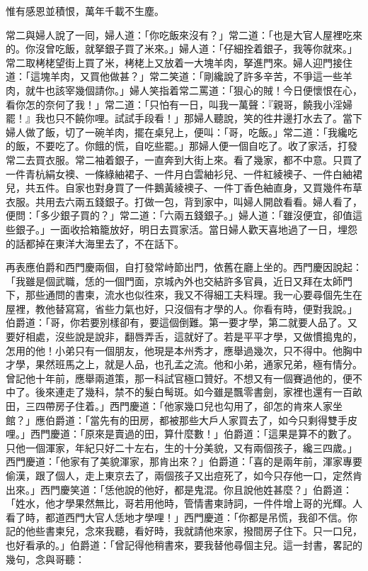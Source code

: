 \begin{myquote}
惟有感恩並積恨，萬年千載不生塵。
\end{myquote}

常二與婦人說了一囘，婦人道：「你吃飯來沒有？」常二道：「也是大官人屋裡吃來的。你沒曾吃飯，就拏銀子買了米來。」婦人道：「仔細拴着銀子，我等你就來。」{}常二取栲栳望街上買了米，栲栳上又放着一大塊羊肉，拏進門來。婦人迎門接住道：「這塊羊肉，又買他做甚？」常二笑道：「剛纔說了許多辛苦，不爭這一些羊肉，就牛也該宰幾個請你。」婦人笑指着常二罵道：「狠心的賊！今日便懷恨在心，看你怎的奈何了我！」常二道：「只怕有一日，叫我一萬聲：『親哥，饒我小淫婦罷！』我也只不饒你哩。試試手段看！」{}那婦人聽說，笑的徃井邊打水去了。當下婦人做了飯，切了一碗羊肉，擺在桌兒上，便叫：「哥，吃飯。」常二道：「我纔吃的飯，不要吃了。你餓的慌，自吃些罷。」那婦人便一個自吃了。收了家活，打發常二去買衣服。常二袖着銀子，一直奔到大街上來。看了幾家，都不中意。只買了一件青杭絹女襖、一條綠紬裙子、一件月白雲紬衫兒、一件紅綾襖子、一件白紬裙兒，共五件。自家也對身買了一件鵝黃綾襖子、一件丁香色紬直身，又買幾件布草衣服。共用去六兩五錢銀子。打做一包，背到家中，叫婦人開啟看看。婦人看了，便問：「多少銀子買的？」常二道：「六兩五錢銀子。」婦人道：「雖沒便宜，卻值這些銀子。」一面收拾箱籠放好，明日去買家活。當日婦人歡天喜地過了一日，埋怨的話都掉在東洋大海里去了，不在話下。

再表應伯爵和西門慶兩個，自打發常峙節出門，依舊在廳上坐的。西門慶因說起：「我雖是個武職，恁的一個門面，京城內外也交結許多官員，近日又拜在太師門下，那些通問的書柬，流水也似徃來，我又不得細工夫料理。我一心要尋個先生在屋裡，教他替寫寫，省些力氣也好，只沒個有才學的人。你看有時，便對我說。」伯爵道：「哥，你若要別樣卻有，要這個倒難。第一要才學，第二就要人品了。又要好相處，沒些說是說非，翻唇弄舌，這就好了。若是平平才學，又做慣搗鬼的，怎用的他！小弟只有一個朋友，他現是本州秀才，應舉過幾次，只不得中。他胸中才學，果然班馬之上，就是人品，也孔孟之流。他和小弟，通家兄弟，極有情分。曾記他十年前，應舉兩道策，那一科試官極口贊好。不想又有一個賽過他的，便不中了。後來連走了幾科，禁不的髮白髩斑。如今雖是飄零書劍，家裡也還有一百畝田，三四帶房子住着。」西門慶道：「他家幾口兒也勾用了，卻怎的肯來人家坐館？」應伯爵道：「當先有的田房，都被那些大戶人家買去了，如今只剩得雙手皮哩。」{}西門慶道：「原來是賣過的田，算什麼數！」伯爵道：「這果是算不的數了。只他一個渾家，年紀只好二十左右，生的十分美貌，又有兩個孩子，纔三四歲。」西門慶道：「他家有了美貌渾家，那肯出來？」伯爵道：「喜的是兩年前，渾家專要偷漢，跟了個人，走上東京去了，兩個孩子又出痘死了，如今只存他一口，定然肯出來。」西門慶笑道：「恁他說的他好，都是鬼混。你且說他姓甚麼？」伯爵道：「姓水，他才學果然無比，哥若用他時，管情書柬詩詞，一件件增上哥的光輝。人看了時，都道西門大官人恁地才學哩！」西門慶道：「你都是吊慌，我卻不信。你記的他些書柬兒，念來我聽，看好時，我就請他來家，撥間房子住下。只一口兒，也好看承的。」伯爵道：「曾記得他稍書來，要我替他尋個主兒。這一封書，畧記的幾句，念與哥聽：

